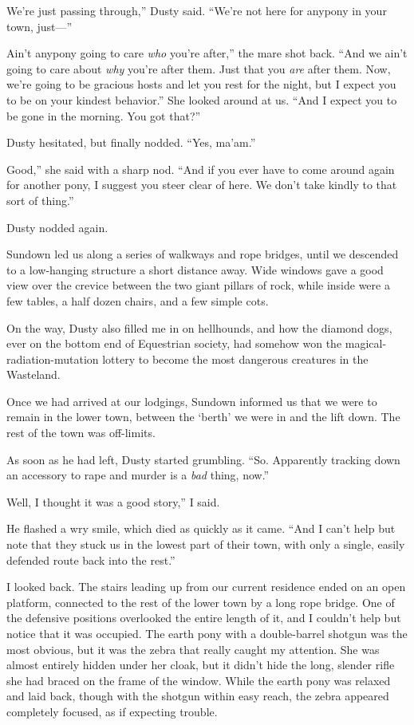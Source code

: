\leavevmode{}We’re just passing through,” Dusty said. “We’re not here for anypony in your town, just—”

\leavevmode{}Ain’t anypony going to care \textit{who} you’re after,” the mare shot back. “And we ain’t going to care about \textit{why} you’re after them. Just that you \textit{are} after them. Now, we’re going to be gracious hosts and let you rest for the night, but I expect you to be on your kindest behavior.” She looked around at us. “And I expect you to be gone in the morning. You got that?”

Dusty hesitated, but finally nodded. “Yes, ma’am.”

\leavevmode{}Good,” she said with a sharp nod. “And if you ever have to come around again for another pony, I suggest you steer clear of here. We don’t take kindly to that sort of thing.”

Dusty nodded again.

Sundown led us along a series of walkways and rope bridges, until we descended to a low-hanging structure a short distance away. Wide windows gave a good view over the crevice between the two giant pillars of rock, while inside were a few tables, a half dozen chairs, and a few simple cots.

On the way, Dusty also filled me in on hellhounds, and how the diamond dogs, ever on the bottom end of Equestrian society, had somehow won the magical-radiation-mutation lottery to become the most dangerous creatures in the Wasteland.

Once we had arrived at our lodgings, Sundown informed us that we were to remain in the lower town, between the ‘berth’ we were in and the lift down. The rest of the town was off-limits.

As soon as he had left, Dusty started grumbling. “So. Apparently tracking down an accessory to rape and murder is a \textit{bad} thing, now.”

\leavevmode{}Well, I thought it was a good story,” I said.

He flashed a wry smile, which died as quickly as it came. “And I can’t help but note that they stuck us in the lowest part of their town, with only a single, easily defended route back into the rest.”

I looked back. The stairs leading up from our current residence ended on an open platform, connected to the rest of the lower town by a long rope bridge. One of the defensive positions overlooked the entire length of it, and I couldn’t help but notice that it was occupied. The earth pony with a double-barrel shotgun was the most obvious, but it was the zebra that really caught my attention. She was almost entirely hidden under her cloak, but it didn’t hide the long, slender rifle she had braced on the frame of the window. While the earth pony was relaxed and laid back, though with the shotgun within easy reach, the zebra appeared completely focused, as if expecting trouble.

